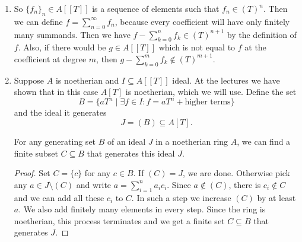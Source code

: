 \newcommand{\sheet}{3}




\maketitle

\begin{exercise}{1}
    \begin{enumerate}
        \item So ${\{f_n\}}_n \in A[[T]]$ is a sequence of elements such that $f_n
            \in {(T)}^n$. Then we can define $f = \sum^{\infty}_{n = 0} f_n$,
            because every coefficient will have only finitely many summands.
            Then we have $f - \sum^{n}_{k = 0} f_k \in {(T)}^{n+1}$ by
            the definition of $f$. Also, if there would be $g \in A[[T]]$ which
            is not equal to $f$ at the coefficient at degree $m$, then $g -
            \sum^{m}_{k = 0} f_k \notin {(T)}^{m+1}$.
        \item Suppose $A$ is noetherian and $I \subseteq A[[T]]$ ideal. At the
            lectures we have shown that in this case $A[T]$ is noetherian, which
            we will use.
            Define the set
            \begin{equation*}
                B = \{ a T^n \mid \exists f \in I \colon f = a T^n +
                \text{higher terms} \}
            \end{equation*}
            and the ideal it generates
            \begin{equation*}
                J = (B) \subseteq A[T].
            \end{equation*}

            \begin{claim}
                For any generating set $B$ of an ideal $J$ in a noetherian ring
                $A$, we can find a finite subset $C \subseteq B$ that generates
                this ideal $J$.
            \end{claim}

            \begin{proof}
                Set $C = \{c\}$ for any $c \in B$. If $(C) = J$, we are done.
                Otherwise pick any $a \in J \setminus (C)$ and write $a =
                \sum^{n}_{i=1} a_i c_i$. Since $a \notin (C)$, there is $c_i
                \notin C$ and we can add all these $c_i$ to $C$. In such a step
                we increase $(C)$ by at least $a$. We also add finitely many
                elements in every step. Since the ring is noetherian, this
                process terminates and we get a finite set $C \subseteq B$ that
                generates $J$.
            \end{proof}


\end{enumerate}
\end{exercise}
